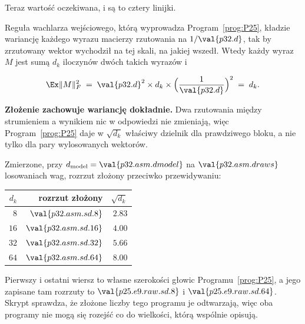 \begin{fr}
Teraz wartość oczekiwana, i są to cztery linijki.

Reguła wachlarza wejściowego, którą wyprowadza Program~\ref{prog:P25}, kładzie
wariancję każdego wyrazu macierzy rzutowania na $1/\val{p32.d}$, tak by
zrzutowany wektor wychodził na tej skali, na jakiej wszedł. Wtedy każdy wyraz
$M$ jest sumą $d_k$ iloczynów dwóch takich wyrazów i

\[ \Ex\lVert M\rVert_F^{2}
   \;=\; \val{p32.d}^{2} \times d_k \times
         \Bigl(\frac{1}{\val{p32.d}}\Bigr)^{2}
   \;=\; d_k. \]

\textbf{Złożenie zachowuje wariancję dokładnie.} Dwa rzutowania między
strumieniem a wynikiem nic w odpowiedzi nie zmieniają, więc
Program~\ref{prog:P25} daje w $\sqrt{d_k}$ właściwy dzielnik dla prawdziwego
bloku, a nie tylko dla pary wylosowanych wektorów.

Zmierzone, przy $d_{\text{model}} = \val{p32.asm.dmodel}$ na
$\val{p32.asm.draws}$ losowaniach wag, rozrzut złożony przeciwko przewidywaniu:

\begin{center}
\begin{tabular}{rrr}
\toprule
$d_k$ & rozrzut złożony & $\sqrt{d_k}$ \\
\midrule
$8$  & $\val{p32.asm.sd.8}$  & $\num{2.83}$ \\
$16$ & $\val{p32.asm.sd.16}$ & $\num{4.00}$ \\
$32$ & $\val{p32.asm.sd.32}$ & $\num{5.66}$ \\
$64$ & $\val{p32.asm.sd.64}$ & $\num{8.00}$ \\
\bottomrule
\end{tabular}
\end{center}

Pierwszy i ostatni wiersz to własne szerokości głowic
Programu~\ref{prog:P25}, a jego zapisane tam rozrzuty to
$\val{p25.e9.raw.sd.8}$ i $\val{p25.e9.raw.sd.64}$. Skrypt sprawdza, że
złożone liczby tego programu je odtwarzają, więc oba programy nie mogą się
rozejść co do wielkości, którą wspólnie opisują.
\end{fr}

